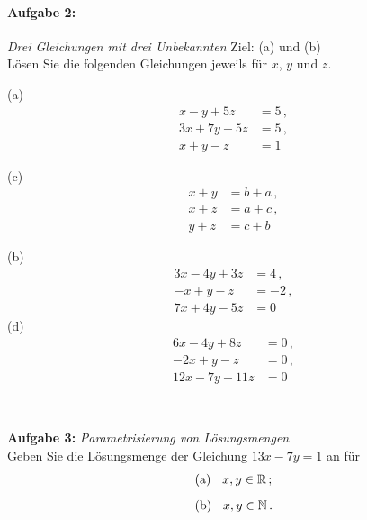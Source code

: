 \paragraph{Aufgabe 2: } \emph{Drei Gleichungen mit drei Unbekannten} \hfill Ziel: (a) und (b)\\[0.2cm]
Lösen Sie die folgenden Gleichungen jeweils für $x$, $y$ und $z$. %
%
\begin{center}
\begin{minipage}[t]{0.3\linewidth}
(a)\vspace{-2.7em}
\begin{align*}
    x-y+5z&=5\,,\\
    3x+7y-5z&=5\,,\\
    x+y-z&=1
\end{align*}

(c)\vspace{-2.7em}
\begin{align*}
    x+y&=b+a\,,\\
    x+z&=a+c\,,\\
    y+z&=c+b
\end{align*}
\end{minipage} \hspace{1.5cm}
\begin{minipage}[t]{0.4\linewidth}
%
(b)\vspace{-2.7em}
\begin{align*}
    3x-4y+3z&=4\,,\\
    -x+y-z&=-2\,,\\
    7x+4y-5z&=0
\end{align*}
(d)\vspace{-2.7em}
\begin{align*}
    6x-4y+8z&=0\,, \\
    -2x+y-z&=0\,,\\
    12x-7y+11z&=0
\end{align*}
\end{minipage} \\[0.2cm]
\end{center}
\vspace{0.7cm}

\newpage
% 
\textbf{Aufgabe 3: } \emph{Parametrisierung von Lösungsmengen}\\[0.2cm]
Geben Sie die Lösungsmenge der Gleichung $13x-7y=1$ an für
\begin{align*}
&\text{(a) } \hspace{0.2cm} x,y\in\mathbb{R}\,;\\[0.2cm]
&\text{(b) } \hspace{0.2cm} x,y\in\mathbb{N}\,.
\end{align*}

